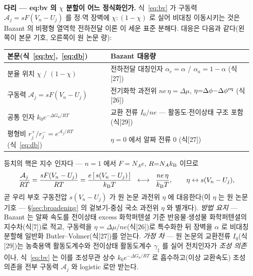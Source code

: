 \begin{srcbox}
\textbf{다리 --- eq:bv 의 $\chi$ 분할이 어느 정식화인가.} 식~\eqref{eq:bv} 가 구동력
$\mathcal A_j=sF(V_n-U_j)$ 를 정$\cdot$역 장벽에 $\chi:(1-\chi)$ 로 실어 비대칭 이동시키는 것은
Bazant 의 비평형 열역학 전하전달 이론\cite{bazant2013} 이 세운 표준 분해다. 대응은 다음과 같다(왼쪽이
본문 기호, 오른쪽이 원 논문 량):
\begin{center}\footnotesize
\begin{tabular}{@{}ll@{}}
\hline
본문(식~\eqref{eq:bv},~\eqref{eq:db}) & Bazant\cite{bazant2013} 대응량 \\
\hline
분율 위치 $\chi$ / $(1-\chi)$ & 전하전달 대칭인자 $\alpha_c{=}\alpha$ / $\alpha_a{=}1{-}\alpha$ (식[27]) \\
구동력 $\mathcal A_j=sF(V_n-U_j)$ & 전기화학 과전위 $ne\,\eta=\Delta\mu$, $\eta{=}\Delta\phi{-}\Delta\phi^{\mathrm{eq}}$ (식[26]) \\
공통 인자 $k_0e^{-\Delta G_a/RT}$ & 교환 전류 $I_0/ne$ --- 활동도$\cdot$전이상태 구조 포함 (식[29]) \\
평형비 $r_j^+/r_j^-=e^{\mathcal A_j/RT}$ (식~\eqref{eq:db}) & $\eta{=}0$ 에서 알짜 전류 $0$ (식[27]) \\
\hline
\end{tabular}
\end{center}
등치의 핵은 지수 인자다 --- $n{=}1$ 에서 $F{=}N_A e$, $R{=}N_Ak_{\mathrm B}$ 이므로
\begin{equation}
\frac{\mathcal A_j}{RT}=\frac{sF(V_n-U_j)}{RT}=\frac{e\,[\,s(V_n-U_j)\,]}{k_{\mathrm B} T}
\;\;\longleftrightarrow\;\;\frac{ne\,\eta}{k_{\mathrm B} T},\qquad \eta \leftrightarrow s(V_n-U_j),
\label{eq:br-bazant2013-1}
\end{equation}
곧 우리 부호 구동전압 $s(V_n-U_j)$ 가 원 논문 과전위 $\eta$ 에 대응한다(이 $\eta$ 는 원 논문 기호 --- \S\ref{sec:broadening} 의 겉보기-중심 국소 과전위 $\eta$ 와 별개다). \emph{방법 요지} --- Bazant 는 알짜
속도를 전이상태 excess 화학퍼텐셜 기준 반응물$\cdot$생성물 화학퍼텐셜의 지수차(식[7])로 적고, 구동력을
$\eta=\Delta\mu/ne$(식[26])로 특수화한 뒤 장벽을 $\alpha$ 로 비대칭 분할해 일반화 Butler--Volmer(식[27])를
얻는다. \emph{가정 차} --- 원 논문의 교환전류 $I_0$(식[29])는 농축용액 활동도계수와 전이상태 활동도계수
$\gamma_\ddagger$ 를 실어 전치인자가 \emph{조성 의존}이나, 식~\eqref{eq:bv} 는 이를 조성무관 상수
$k_0e^{-\Delta G_a/RT}$ 로 흡수하고(이상 교환속도) 조성 의존을 전부 구동력 $\mathcal A_j$ 와 logistic 로만
받는다.
\end{srcbox}

